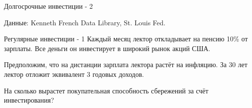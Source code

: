 \documentclass{beamer}
\begin{document}
\newcommand{\addQuantilePlot}[3] {
    \addplot[
        color=#2,
        style=#3,
        thick
    ] 
    table [
        x=holding_period,
        y=#1,
        col sep=comma
    ]
    {data/us_mkt_holding_periods.csv};
}



\begin{frame}{Долгосрочные инвестиции - 2}
\centering
{}
{\scriptsize Данные: Kenneth French Data Library, St. Louis Fed.}
\end{frame}



\begin{frame}{Регулярные инвестиции - 1}
\justify
Каждый месяц лектор откладывает на пенсию 10\% от зарплаты. Все деньги он инвестирует в 
широкий рынок акций США.

\justify
Предположим, что на дистанции зарплата лектора растёт на инфляцию. За 30 лет лектор 
отложит эквивалент 3 годовых доходов.

\justify
На сколько вырастет покупательная способность сбережений за счёт 
инвестирования?
\end{frame}

\newcommand{\addQuantilePlotRegular}[3] {
    \addplot[
        color=#2,
        style=#3,
        thick
    ] 
    table [
        x=holding_period,
        y=#1,
        col sep=comma
    ]
    {data/us_mkt_regular_investment.csv};
}
\end{document}
